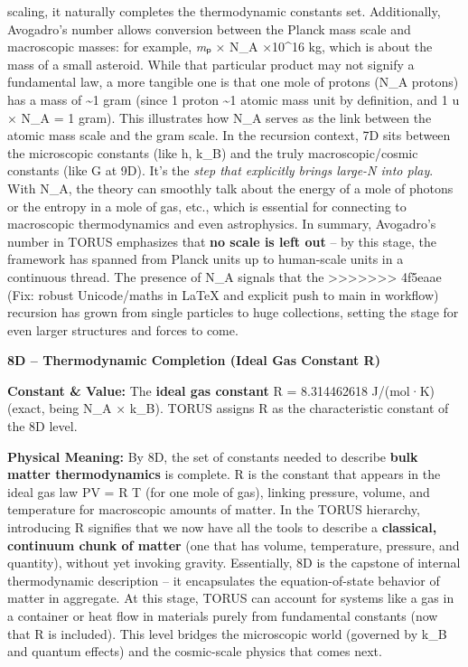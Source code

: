 \documentclass[]{article}
\begin{document}
scaling, it naturally completes the thermodynamic constants set.
Additionally, Avogadro's number allows conversion between the Planck
mass scale and macroscopic masses: for example, \emph{m}ₚ × N\_A ×10\^{}16 kg​, which is about the mass of a small asteroid. While
that particular product may not signify a fundamental law, a more
tangible one is that one mole of protons (N\_A protons) has a mass of
\textasciitilde{}1 gram (since 1 proton \textasciitilde{}1 atomic mass
unit by definition, and 1 u × N\_A = 1 gram). This illustrates how N\_A
serves as the link between the atomic mass scale and the gram scale​. In
the recursion context, 7D sits between the microscopic constants (like
h, k\_B) and the truly macroscopic/cosmic constants (like G at 9D). It's
the \emph{step that explicitly brings large-N into play}. With N\_A, the
theory can smoothly talk about the energy of a mole of photons or the
entropy in a mole of gas, etc., which is essential for connecting to
macroscopic thermodynamics and even astrophysics. In summary, Avogadro's
number in TORUS emphasizes that \textbf{no scale is left out} -- by this
stage, the framework has spanned from Planck units up to human-scale
units in a continuous thread​. The presence of N\_A signals that the
>>>>>>> 4f5eaae (Fix: robust Unicode/maths in LaTeX and explicit push to main in workflow)
recursion has grown from single particles to huge collections, setting
the stage for even larger structures and forces to come.

\textbf{8D -- Thermodynamic Completion (Ideal Gas Constant R)}

\textbf{Constant \& Value:} The \textbf{ideal gas constant} R =
8.314462618 J/(mol·K) (exact, being N\_A × k\_B)​. TORUS assigns R as
the characteristic constant of the 8D level.

\textbf{Physical Meaning:} By 8D, the set of constants needed to
describe \textbf{bulk matter thermodynamics} is complete. R is the
constant that appears in the ideal gas law PV = R T (for one mole of
gas), linking pressure, volume, and temperature for macroscopic amounts
of matter​. In the TORUS hierarchy, introducing R signifies that we now
have all the tools to describe a \textbf{classical, continuum chunk of
matter} (one that has volume, temperature, pressure, and quantity),
without yet invoking gravity. Essentially, 8D is the capstone of
internal thermodynamic description -- it encapsulates the
equation-of-state behavior of matter in aggregate. At this stage, TORUS
can account for systems like a gas in a container or heat flow in
materials purely from fundamental constants (now that R is included).
This level bridges the microscopic world (governed by k\_B and quantum
effects) and the cosmic-scale physics that comes next.
\end{document}
